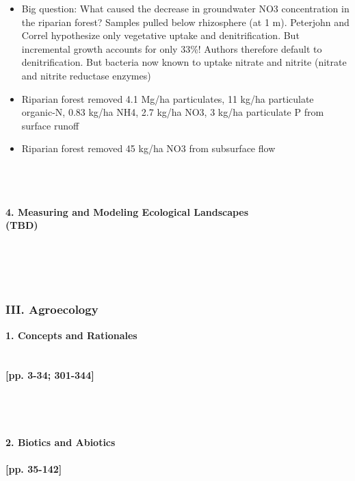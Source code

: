 \documentclass[12pt]{article}
\begin{document}
\begin{itemize}
	\item Big question: What caused the decrease in groundwater NO3 concentration in the riparian forest? Samples pulled below rhizosphere (at 1 m). Peterjohn and Correl hypothesize only vegetative uptake and denitrification. But incremental growth accounts for only 33\%! Authors therefore default to denitrification. But bacteria now known to uptake nitrate and nitrite (nitrate and nitrite reductase enzymes)
	\item Riparian forest removed 4.1 Mg/ha particulates, 11 kg/ha particulate organic-N, 0.83 kg/ha NH4, 2.7 kg/ha NO3, 3 kg/ha particulate P  from surface runoff
	\item Riparian forest removed 45 kg/ha NO3 from subsurface flow
\end{itemize}
 \cite{wegner_movements_1979}\\
 \cite{walker_use_2010}\\
 \cite{wiens_population_1976}\\

\textbf{ 4. Measuring and Modeling Ecological Landscapes}\\
 \cite{dale_spatial_2014} \textbf{(TBD)}\\
 \cite{naveh_biocybernetic_1987}\\
 \cite{lefkovitch_spatial_1985}\\
 \cite{scheller_ecological_2007}\\
 \cite{scheller_robert_m._landscape_2013}\\
 \cite{scheller_design_2007}


\subsubsection{III. Agroecology}
\textbf{ 1. Concepts and Rationales}\\
 \cite{tilman_agricultural_2002}\\
 \cite{godfray_food_2010}\\
 \cite{gliessman_agroecology:_2015} \textbf{[pp. 3-34; 301-344]}\\
 \cite{wolfe_crop_2000}\\
 \cite{beus_conventional_1990}\\
 \cite{rosset_multiple_2000}\\
 \cite{thompson_agrarian_2010}\\

\textbf{ 2. Biotics and Abiotics}\\
 \cite{schmidt_persistence_2011}\\
 \cite{gliessman_agroecology:_2015} \textbf{[pp. 35-142]}\\
\end{document}
